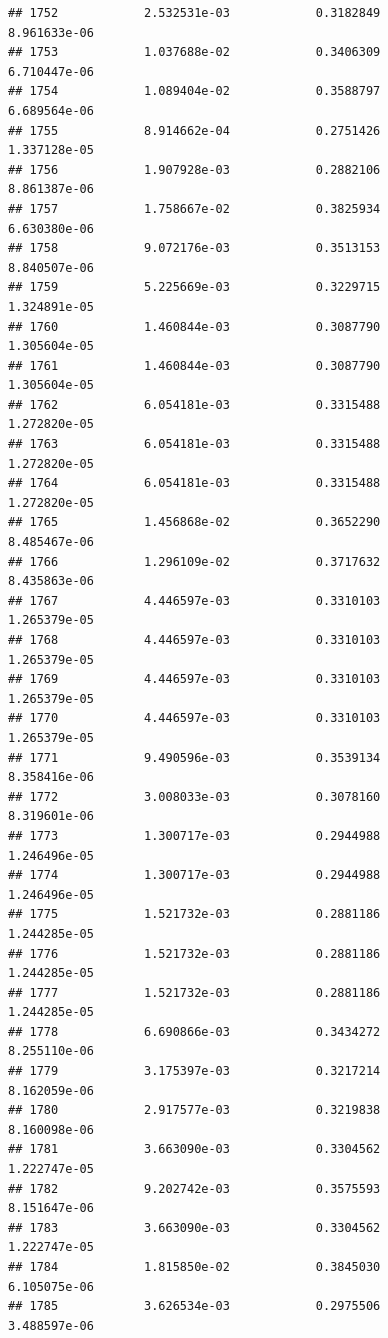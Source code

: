 \documentclass[
]{article}
\begin{document}
\begin{verbatim}
## 1752            2.532531e-03            0.3182849            8.961633e-06
## 1753            1.037688e-02            0.3406309            6.710447e-06
## 1754            1.089404e-02            0.3588797            6.689564e-06
## 1755            8.914662e-04            0.2751426            1.337128e-05
## 1756            1.907928e-03            0.2882106            8.861387e-06
## 1757            1.758667e-02            0.3825934            6.630380e-06
## 1758            9.072176e-03            0.3513153            8.840507e-06
## 1759            5.225669e-03            0.3229715            1.324891e-05
## 1760            1.460844e-03            0.3087790            1.305604e-05
## 1761            1.460844e-03            0.3087790            1.305604e-05
## 1762            6.054181e-03            0.3315488            1.272820e-05
## 1763            6.054181e-03            0.3315488            1.272820e-05
## 1764            6.054181e-03            0.3315488            1.272820e-05
## 1765            1.456868e-02            0.3652290            8.485467e-06
## 1766            1.296109e-02            0.3717632            8.435863e-06
## 1767            4.446597e-03            0.3310103            1.265379e-05
## 1768            4.446597e-03            0.3310103            1.265379e-05
## 1769            4.446597e-03            0.3310103            1.265379e-05
## 1770            4.446597e-03            0.3310103            1.265379e-05
## 1771            9.490596e-03            0.3539134            8.358416e-06
## 1772            3.008033e-03            0.3078160            8.319601e-06
## 1773            1.300717e-03            0.2944988            1.246496e-05
## 1774            1.300717e-03            0.2944988            1.246496e-05
## 1775            1.521732e-03            0.2881186            1.244285e-05
## 1776            1.521732e-03            0.2881186            1.244285e-05
## 1777            1.521732e-03            0.2881186            1.244285e-05
## 1778            6.690866e-03            0.3434272            8.255110e-06
## 1779            3.175397e-03            0.3217214            8.162059e-06
## 1780            2.917577e-03            0.3219838            8.160098e-06
## 1781            3.663090e-03            0.3304562            1.222747e-05
## 1782            9.202742e-03            0.3575593            8.151647e-06
## 1783            3.663090e-03            0.3304562            1.222747e-05
## 1784            1.815850e-02            0.3845030            6.105075e-06
## 1785            3.626534e-03            0.2975506            3.488597e-06

\end{verbatim}
\end{document}

